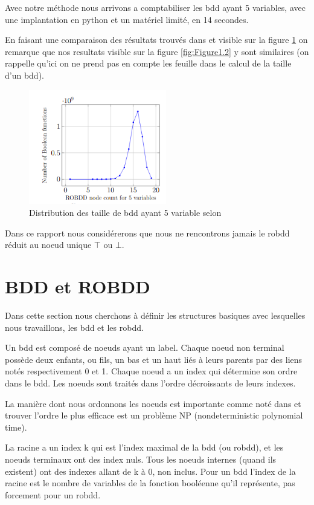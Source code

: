 \documentclass[french]{article}
\begin{document}
Avec notre méthode nous arrivons a comptabiliser les bdd ayant 5 variables, avec une implantation en python et un matériel limité, en 14 secondes.\medskip

En faisant une comparaison des résultats trouvés dans \cite{newton} et visible sur la figure \ref{fig:Figure1.3} on remarque que nos resultats visible sur la figure \ref{fig:Figure1.2} y sont similaires (on rappelle qu'ici on ne prend pas en compte les feuille dans le calcul de la taille d'un bdd).\medskip

\begin{figure}[htp]
    \centering
    \includegraphics[width=6cm, height=5cm]{screen de newton.png}
    \caption{Distribution des taille de bdd ayant 5 variable selon \cite{newton}}
    \label{fig:Figure1.3}
\end{figure}

Dans ce rapport nous considérerons que nous ne rencontrons jamais le robdd réduit au noeud unique \(\top\) ou \(\bot.\)
\newpage
\section{BDD et ROBDD}
Dans cette section nous cherchons à définir les structures basiques avec lesquelles nous travaillons, les bdd et les robdd.\medskip

Un bdd est composé de noeuds ayant un label. Chaque noeud non terminal possède deux enfants, ou fils, un bas et un haut liés à leurs parents par des liens notés respectivement 0 et 1. Chaque noeud a un index qui détermine son ordre dans le bdd. Les noeuds sont traités dans l'ordre décroissants de leurs indexes.

La manière dont nous ordonnons les noeuds est importante comme noté dans \cite{newton} et trouver l'ordre le plus efficace est un problème NP (nondeterministic polynomial time).

La racine a un index k qui est l'index maximal de la bdd (ou robdd), et les noeuds terminaux ont des index nuls. Tous les noeuds internes (quand ils existent) ont des indexes allant de k à 0, non inclus. Pour un bdd l'index de la racine est le nombre de variables de la fonction booléenne qu'il représente, pas forcement pour un robdd.\medskip
\end{document}
